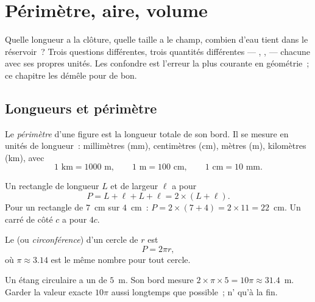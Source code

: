 \chapter{Périmètre, aire, volume}\label{ch:g6:measure}

Quelle longueur a la clôture, quelle taille a le champ, combien d'eau
tient dans le réservoir~? Trois questions différentes, trois quantités
différentes --- , ,  --- chacune avec ses propres
unités. Les confondre est l'erreur la plus courante en géométrie~; ce
chapitre les démêle pour de bon.

\section{Longueurs et périmètre}

\begin{definition}[Périmètre]\label{def:g6:measure:perimeter}
Le \emph{périmètre} d'une figure est la longueur
totale de son bord. Il se mesure en unités de longueur~: millimètres
(mm), centimètres (cm), mètres (m), kilomètres (km), avec
\[
1 \text{ km} = 1000 \text{ m}, \qquad
1 \text{ m} = 100 \text{ cm}, \qquad
1 \text{ cm} = 10 \text{ mm}.
\]
\end{definition}

\begin{example}\label{ex:g6:measure:perimeter}
Un rectangle de longueur $L$ et de largeur $\ell$ a pour 
\[
P = L + \ell + L + \ell = 2 \times (L + \ell).
\]
Pour un rectangle de $7$~cm sur $4$~cm~: $P = 2 \times (7 + 4) = 2 \times 11 =
22$~cm. Un carré de côté $c$ a pour  $4c$.
\end{example}

\begin{proposition}\label{prop:g6:measure:circle}
Le  (ou \emph{circonférence}) d'un cercle de  $r$ est
\[
P = 2 \pi r ,
\]
où $\pi \approx 3.14$ est le même nombre pour tout cercle.
\end{proposition}
\admitted

\begin{example}
Un étang circulaire a un  de $5$~m. Son bord mesure
$2 \times \pi \times 5 = 10\pi \approx 31.4$~m. Garder la valeur
exacte $10\pi$ aussi longtemps que possible~; n' qu'à la fin.
\end{example}

